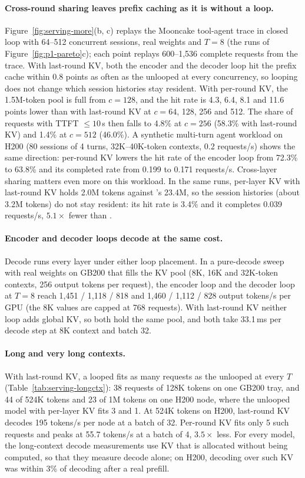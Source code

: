 \paragraph{Cross-round sharing leaves prefix caching as it is without a loop.}
Figure~\ref{fig:serving-more}(b, c) replays the Mooncake tool-agent trace in closed loop
with 64--512 concurrent sessions, real weights and $T=8$ (the runs of Figure~\ref{fig:p1-pareto}c); each point replays
600--1{,}536 complete requests from the trace. With last-round KV, both the encoder and
the decoder loop hit the prefix cache within 0.8 points as often as the unlooped \ced at every concurrency, so looping
does not change which session histories stay resident. With per-round KV, the 1.5M-token pool is full from $c=128$,
and the hit rate is 4.3, 6.4, 8.1 and 11.6 points lower than with last-round KV at $c=64$, 128, 256 and 512. The
share of requests with TTFT $\le 10$\,s then falls to 4.8\% at $c=256$ (58.3\% with last-round KV) and 1.4\% at
$c=512$ (46.0\%). A synthetic multi-turn agent workload on H200 (80 sessions of 4 turns, 32K--40K-token contexts,
0.2 requests/s) shows the same direction: per-round KV lowers the hit rate of the encoder loop from 72.3\% to 63.8\%
and its completed rate from 0.199 to 0.171 requests/s. Cross-layer sharing matters even more on this workload. In the
same runs, per-layer KV with last-round KV holds 2.0M tokens against \ced's 23.4M, so the session histories (about
3.2M tokens) do not stay resident: its hit rate is 3.4\% and it completes 0.039 requests/s, $5.1\times$ fewer than
\ourmethod.

\paragraph{Encoder and decoder loops decode at the same cost.}
Decode runs every layer under either loop placement. In a pure-decode sweep with real weights on GB200 that fills the KV
pool (8K, 16K and 32K-token contexts, 256 output tokens per request), the encoder loop and the decoder loop at $T=8$
reach 1{,}451 / 1{,}118 / 818 and 1{,}460 / 1{,}112 / 828 output tokens/s per GPU (the 8K values are capped at 768
requests). With last-round KV neither loop adds global KV, so both hold the same pool, and both take 33.1\,ms per decode
step at 8K context and batch 32.

\paragraph{Long and very long contexts.}
With last-round KV, a looped \ced fits as many requests as the unlooped \ced at every $T$
(Table~\ref{tab:serving-longctx}): 38 requests of 128K tokens on one GB200 tray, and 44 of 524K tokens and 23 of 1M
tokens on one H200 node, where the unlooped model with per-layer KV fits 3 and 1. At 524K tokens on H200, last-round KV
decodes 195 tokens/s per node at a batch of 32. Per-round KV fits only 5 such requests and peaks at 55.7 tokens/s at a
batch of 4, $3.5\times$ less. For every model, the long-context decode measurements use KV that is allocated without
being computed, so that they measure decode alone; on H200, decoding over such KV was within 3\% of decoding after a
real prefill.
